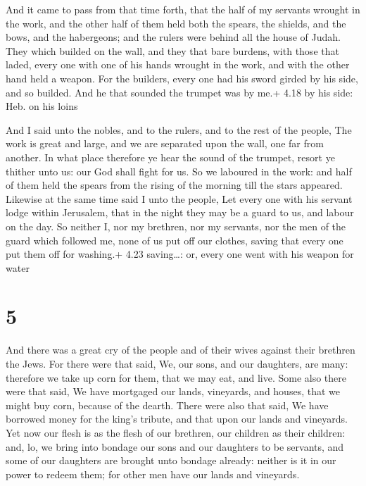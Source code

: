  And it came to pass from that time forth, that the half of
my servants wrought in the work, and the other half of them held both
the spears, the shields, and the bows, and the habergeons; and the
rulers were behind all the house of Judah.  They which
builded on the wall, and they that bare burdens, with those that laded,
every one with one of his hands wrought in the work, and with the other
hand held a weapon.  For the builders, every one had his
sword girded by his side, and so builded. And he that sounded the
trumpet was by me.+ 4.18 by his side: Heb. on his loins

 And I said unto the nobles, and to the rulers, and to
the rest of the people, The work is great and large, and we are
separated upon the wall, one far from another.  In what
place therefore ye hear the sound of the trumpet, resort ye thither unto
us: our God shall fight for us.  So we laboured in the
work: and half of them held the spears from the rising of the morning
till the stars appeared.  Likewise at the same time said I
unto the people, Let every one with his servant lodge within Jerusalem,
that in the night they may be a guard to us, and labour on the day.
 So neither I, nor my brethren, nor my servants, nor the
men of the guard which followed me, none of us put off our clothes,
saving that every one put them off for washing.+ 4.23 saving\ldots: or,
every one went with his weapon for water

\hypertarget{section-4}{%
\section{5}\label{section-4}}

 And there was a great cry of the people and of their wives
against their brethren the Jews.  For there were that said,
We, our sons, and our daughters, are many: therefore we take up corn for
them, that we may eat, and live.  Some also there were that
said, We have mortgaged our lands, vineyards, and houses, that we might
buy corn, because of the dearth.  There were also that said,
We have borrowed money for the king's tribute, and that upon our lands
and vineyards.  Yet now our flesh is as the flesh of our
brethren, our children as their children: and, lo, we bring into bondage
our sons and our daughters to be servants, and some of our daughters are
brought unto bondage already: neither is it in our power to redeem them;
for other men have our lands and vineyards.

